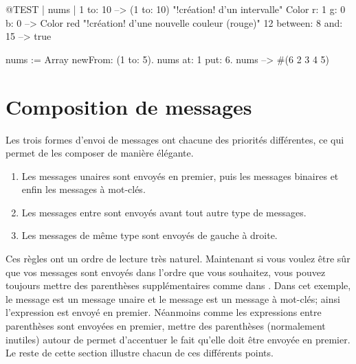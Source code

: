 \documentclass[a4paper,10pt,twoside]{book}
\begin{document}

\begin{code}{@TEST | nums |}
1 to: 10                        --> (1 to: 10)  "!cr\'eation! d'un intervalle"
Color r: 1 g: 0 b: 0       --> Color red  "!cr\'eation! d'une nouvelle
couleur (rouge)"
12 between: 8 and: 15 --> true

nums := Array newFrom: (1 to: 5).
nums at: 1 put: 6.
nums --> #(6 2 3 4 5)
\end{code}


\section{Composition de messages}
Les trois formes d'envoi de messages ont chacune des priorit\'es diff\'erentes, ce qui permet de les composer de mani\`ere \'el\'egante.

\begin{enumerate}
\item Les messages unaires sont envoy\'es en premier, puis les messages binaires et enfin les messages \`a mot-cl\'es.
\item Les messages entre  sont envoy\'es avant tout autre type de messages. 
\item Les messages de m\^eme type sont envoy\'es de gauche \`a droite. 
\end{enumerate}

Ces r\`egles ont un ordre de lecture tr\`es naturel. Maintenant si
vous voulez \^etre s\^ur que vos messages sont envoy\'es dans l'ordre
que vous souhaitez, vous pouvez toujours mettre des parenth\`eses
suppl\'ementaires comme dans . Dans cet exemple, le
message  est un message unaire et le message 
est un message \`a mot-cl\'es; ainsi l'expression 
est envoy\'e en premier. N\'eanmoins comme les expressions entre
parenth\`eses sont envoy\'ees en premier, mettre des parenth\`eses
(normalement inutiles) autour de  permet d'accentuer
le fait qu'elle
doit \^etre envoy\'ee en premier. Le reste de cette section illustre
chacun de ces diff\'erents points.
\end{document}

